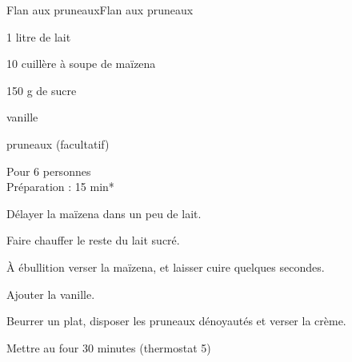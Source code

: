 \begin{recette}{Flan aux pruneaux}{Flan aux pruneaux}

\begin{ingredients}
1 litre de lait\par
10 cuillère à soupe de maïzena\par
150 g de sucre\par
vanille\par
pruneaux (facultatif)\par
\end{ingredients}

\begin{infos}
Pour 6 personnes\\
Préparation : 15 min*		\\
\end{infos}

\begin{etapes}
\item Délayer la maïzena dans un peu de lait.
\item Faire chauffer le reste du lait sucré.
\item À ébullition verser la maïzena, et laisser cuire quelques secondes.
\item Ajouter la vanille.
\item Beurrer un plat, disposer les pruneaux dénoyautés et verser la crème.
\item Mettre au four 30 minutes (thermostat 5)
\end{etapes}

\end{recette}